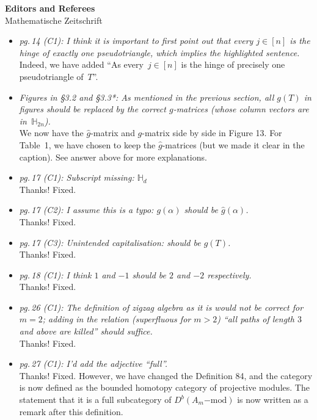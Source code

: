 \documentclass{letter}
\begin{document}
\begin{letter}{{\bf Editors and Referees} \\ Mathematische Zeitschrift}
\begin{itemize}
\item \textsl{\color{gray} pg.\,14 (C1): I think it is important to first point out that every $j \in [n]$ is the hinge of exactly one pseudotriangle, which implies the highlighted sentence.} \\
Indeed, we have added ``As every~$j \in [n]$ is the hinge of precisely one pseudotriangle of~$T$''.

\item \textsl{\color{gray} Figures in §3.2 and §3.3*: As mentioned in the previous section, all $g(T)$ in figures should be replaced by the correct $g$-matrices (whose column vectors are in~$\mathbb{H}_{2n}$).} \\
We now have the $\hat{g}$-matrix and $g$-matrix side by side in Figure 13. For Table~1, we have chosen to keep the $\hat{g}$-matrices (but we made it clear in the caption). See answer above for more explanations.

\item \textsl{\color{gray} pg.\,17 (C1): Subscript missing: $\mathbb{H}_d$} \\
Thanks! Fixed.

\item \textsl{\color{gray} pg.\,17 (C2): I assume this is a typo: $g(\alpha)$ should be $\hat{g}(\alpha)$.} \\
Thanks! Fixed.

\item \textsl{\color{gray} pg.\,17 (C3): Unintended capitalisation: should be $g(T)$.} \\
Thanks! Fixed.

\item \textsl{\color{gray} pg.\,18 (C1): I think $1$ and $-1$ should be $2$ and $-2$ respectively.} \\
Thanks! Fixed.

\item \textsl{\color{gray} pg.\,26 (C1): The definition of zigzag algebra as it is would not be correct for $m = 2$; adding in the relation (superfluous for $m > 2$) ``all paths of length $3$ and above are killed'' should suffice.} \\
Thanks! Fixed.

\item \textsl{\color{gray} pg.\,27 (C1): I'd add the adjective ``full''.} \\
  Thanks! Fixed. However, we have changed the Definition 84, and the category is now defined as the bounded homotopy category of projective modules.
  The statement that it is a full subcategory of \(D^b(A_m\mathrm{-mod})\) is now written as a remark after this definition.


\end{itemize}
\end{letter}
\end{document}
